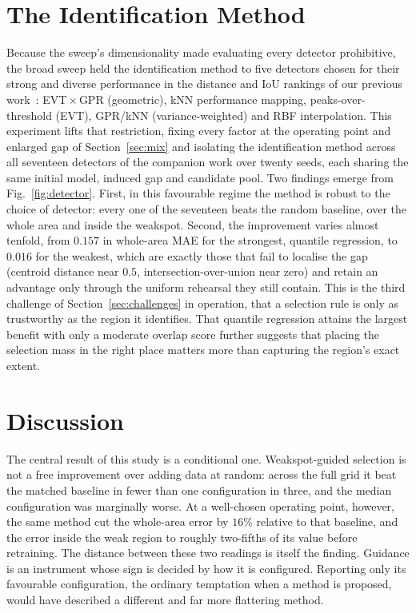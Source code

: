 \documentclass[conference]{IEEEtran}
\begin{document}
\section{The Identification Method}
\label{sec:detector}
Because the sweep's dimensionality made evaluating every detector prohibitive, the
broad sweep held the identification method to five detectors chosen for their strong and
diverse performance in the distance and IoU rankings of our previous
work~\cite{weakspotprior}: EVT\,$\times$\,GPR (geometric),
kNN performance mapping, peaks-over-threshold (EVT), GPR/kNN (variance-weighted) and RBF
interpolation. This experiment lifts that restriction, fixing every factor at the
operating point and enlarged gap of Section~\ref{sec:mix} and isolating the
identification method across all seventeen detectors of the companion work over twenty
seeds, each sharing the same initial model, induced gap and candidate pool. Two findings
emerge from Fig.~\ref{fig:detector}. First, in this
favourable regime the method is robust to the choice of detector: every one of the
seventeen beats the random baseline, over the whole area and inside the weakspot.
Second, the improvement varies almost tenfold, from $0.157$ in whole-area MAE for the
strongest, quantile regression, to $0.016$ for the weakest, which are exactly those that
fail to localise the gap (centroid distance near $0.5$, intersection-over-union near
zero) and retain an advantage only through the uniform rehearsal they still contain.
This is the third challenge of Section~\ref{sec:challenges} in operation, that a
selection rule is only as trustworthy as the region it identifies. That quantile
regression attains the largest benefit with only a moderate overlap score further
suggests that placing the selection mass in the right place matters more than capturing
the region's exact extent.

\section{Discussion}
\label{sec:discussion}

The central result of this study is a conditional one. Weakspot-guided selection is not
a free improvement over adding data at random: across the full grid it beat the matched
baseline in fewer than one configuration in three, and the median configuration was
marginally worse. At a well-chosen operating point, however, the same method cut the
whole-area error by $16\%$ relative to that baseline, and the error inside the weak
region to roughly two-fifths of its value before retraining. The distance between these
two readings is itself the finding. Guidance is an instrument whose sign is decided by
how it is configured. Reporting only its favourable configuration, the ordinary
temptation when a method is proposed, would have described a different and far more
flattering method.
\end{document}
